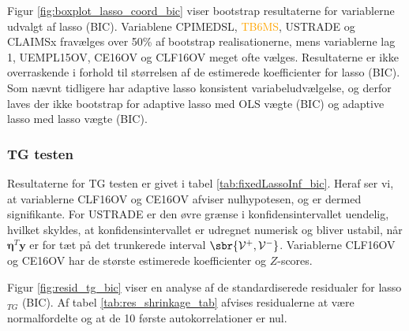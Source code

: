 Figur \ref{fig:boxplot_lasso_coord_bic} viser bootstrap resultaterne for variablerne udvalgt af lasso (BIC).
Variablene \textcolor{cadetblue2}{CPIMEDSL}, \textcolor{orange}{TB6MS}, \textcolor{blue3}{USTRADE} og \textcolor{blue3}{CLAIMSx} fravælges over 50\% af bootstrap realisationerne, mens variablerne \textcolor{blue3}{lag 1}, \textcolor{blue3}{UEMPL15OV}, \textcolor{blue3}{CE16OV} og \textcolor{blue3}{CLF16OV} meget ofte vælges.
Resultaterne er ikke overraskende i forhold til størrelsen af de estimerede koefficienter for lasso (BIC).
Som nævnt tidligere har adaptive lasso konsistent variabeludvælgelse, og derfor laves der ikke bootstrap for adaptive lasso med OLS vægte (BIC) og adaptive lasso med lasso vægte (BIC). 

\subsubsection{TG testen}
Resultaterne for TG testen er givet i tabel \ref{tab:fixedLassoInf_bic}.
Heraf ser vi, at variablerne \textcolor{blue3}{CLF16OV} og \textcolor{blue3}{CE16OV} afviser nulhypotesen, og er dermed signifikante.
For \textcolor{blue3}{USTRADE} er den øvre grænse i konfidensintervallet uendelig, hvilket skyldes, at konfidensintervallet er udregnet numerisk og bliver ustabil, når $\boldsymbol\eta^T \mathbf{y}$ er for tæt på det trunkerede interval \(\sbr{\mathcal{V}^+, \mathcal{V}^-}\). 
Variablerne \textcolor{blue3}{CLF16OV} og \textcolor{blue3}{CE16OV} har de største estimerede koefficienter og $Z$-scores.




Figur \ref{fig:resid_tg_bic} viser en analyse af de standardiserede residualer for lasso$_{TG}$ (BIC). 
Af tabel \ref{tab:res_shrinkage_tab} afvises residualerne at være normalfordelte og at de 10 første autokorrelationer er nul.
